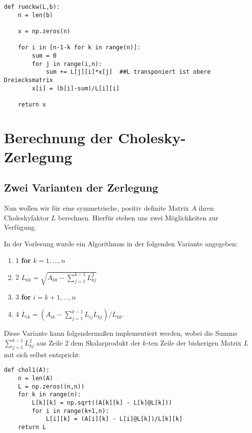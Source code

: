 \lstset{language=Python}
\lstset{frame=lines}
\lstset{basicstyle=\footnotesize}
\begin{lstlisting}
def rueckw(L,b):
    n = len(b)

    x = np.zeros(n)

    for i in [n-1-k for k in range(n)]:
        sum = 0
        for j in range(i,n):
            sum += L[j][i]*x[j]  ##L transponiert ist obere Dreiecksmatrix
        x[i] = (b[i]-sum)/L[i][i]

    return x
\end{lstlisting}

\section{Berechnung der Cholesky-Zerlegung}
\subsection{Zwei Varianten der Zerlegung}

Nun wollen wir für eine symmetrische, positiv definite Matrix $A$ ihren Choleskyfaktor $L$ berechnen. Hierfür stehen uns zwei Möglichkeiten zur Verfügung.

In der Vorlesung wurde ein Algorithmus in der folgenden Variante angegeben:
\begin{enumerate}
\itemsep0em
\item[] 1 \textbf{for} $k = 1,...,n$
\item[] 2 \qquad $L_{kk} = \sqrt{A_{kk} - \sum_{j=1}^{k-1} L_{kj}^2}$
\item[] 3 \qquad \textbf{for} $i = k+1,...,n$
\item[] 4 \qquad \qquad $L_{ik} = (A_{ik} - \sum_{j=1}^{k-1} L_{ij} L_{kj})/L_{kk}$.

\end{enumerate}


Diese Variante kann folgendermaßen implementiert werden, wobei die Summe $\sum_{j=1}^{k-1}L_{kj}^{2}$ aus Zeile $2$ dem Skalarprodukt der $k$-ten Zeile der bisherigen Matrix $L$ mit sich selbst entspricht:

\lstset{language=Python}
\lstset{frame=lines}
\lstset{basicstyle=\footnotesize}
\begin{lstlisting}
def chol1(A):
    n = len(A)
    L = np.zeros((n,n))
    for k in range(n):
        L[k][k] = np.sqrt((A[k][k] - L[k]@L[k]))
        for i in range(k+1,n):
            L[i][k] = (A[i][k] - L[i]@L[k])/L[k][k]
    return L
\end{lstlisting}

